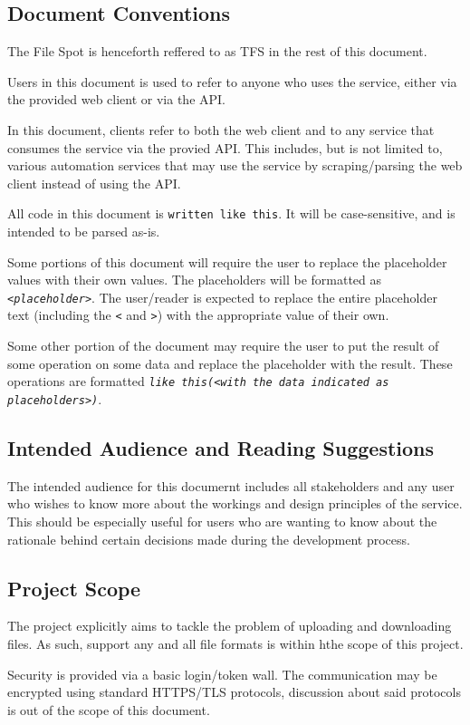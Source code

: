 \documentclass[12pt,a4paper]{report}
\begin{document}
\subsection{Document Conventions}
The File Spot is henceforth reffered to as TFS in the rest of this document.

Users in this document is used to refer to anyone who uses the service, either via the provided web client or via the API.

In this document, clients refer to both the web client and to any service that consumes the service via the provied API. This includes, but is not limited to, various automation services that may use the service by scraping/parsing the web client instead of using the API.

All code in this document is \texttt{written like this}. It will be case-sensitive, and is intended to be parsed as-is.

Some portions of this document will require the user to replace the placeholder values with their own values.
The placeholders will be formatted as \texttt{\textsl{<placeholder>}}.
The user/reader is expected to replace the entire placeholder text (including the \texttt{<} and \texttt{>}) with the appropriate value of their own.

Some other portion of the document may require the user to put the result of some operation on some data and replace the placeholder with the result.
These operations are formatted \texttt{\textit{like this(}\textsl{<with the data indicated as placeholders>}\textit{)}}.
\subsection{Intended Audience and Reading Suggestions}
The intended audience for this documernt includes all stakeholders and any user who wishes to know more about the workings and design principles of the service. This should be especially useful for users who are wanting to know about the rationale behind certain decisions made during the development process.
\subsection{Project Scope}
The project explicitly aims to tackle the problem of uploading and downloading files. As such, support any and all file formats is within hthe scope of this project.

Security is provided via a basic login/token wall. The communication may be encrypted using standard HTTPS/TLS protocols, discussion about said protocols is out of the scope of this document.
\end{document}
